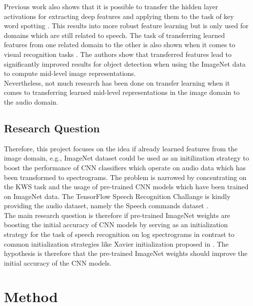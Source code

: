 \documentclass{article}
\theoremstyle{definition}
\theoremstyle{remark}
\begin{document}
Previous work also shows that it is possible to transfer the hidden layer activations for extracting deep features and applying them to the task of key word spotting \cite{retsinas2018transferable}. This results into more robust feature learning but is only used for domains which are still related to speech. The task of transferring learned features from one related domain to the other is also shown when it comes to visual recognition tasks \cite{oquab2014learning}. The authors show that transferred features lead to significantly improved results for object detection when using the ImageNet data to compute mid-level image representations.\\

Nevertheless, not much research has been done on transfer learning when it comes to transferring learned mid-level representations in the image domain to the audio domain.\\




\subsection{Research Question}


Therefore, this project focuses on the idea if already learned features from the image domain, e.g., ImageNet dataset could be used as an initilization strategy to boost the performance of CNN classifiers which operate on audio data which has been transformed to spectrograms. The problem is narrowed by concentrating on the KWS task and the usage of pre-trained CNN models which have been trained on ImageNet data. The TensorFlow Speech Recognition Challange \cite{kaggle_challenge} is kindly providing the audio dataset, namely the Speech commands dataset \cite{scd_v1}.\\

The main research question is therefore if pre-trained ImageNet weights are boosting the initial accuracy of CNN models by serving as an initialization strategy for the task of speech recognition on log spectrograms in contrast to common initialization strategies like Xavier initialization proposed in \cite{gouda2018speech}. The hypothesis is therefore that the pre-trained ImageNet weights should improve the initial accuracy of the CNN models.\\


\section{Method}
\end{document}
